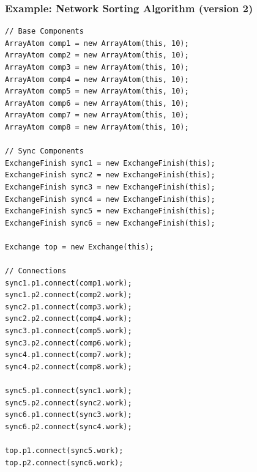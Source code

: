 \documentclass[compress,xcolor=dvipsnames,10pt]{beamer}
\begin{document}
\begin{frame}[fragile]
 \frametitle{Example: Network Sorting Algorithm (version 2)}
        \begin{lstlisting}[style=customjava, basicstyle=\ttfamily\tiny]
// Base Components
ArrayAtom comp1 = new ArrayAtom(this, 10);
ArrayAtom comp2 = new ArrayAtom(this, 10);
ArrayAtom comp3 = new ArrayAtom(this, 10);
ArrayAtom comp4 = new ArrayAtom(this, 10);
ArrayAtom comp5 = new ArrayAtom(this, 10);
ArrayAtom comp6 = new ArrayAtom(this, 10);
ArrayAtom comp7 = new ArrayAtom(this, 10);
ArrayAtom comp8 = new ArrayAtom(this, 10);

// Sync Components
ExchangeFinish sync1 = new ExchangeFinish(this);
ExchangeFinish sync2 = new ExchangeFinish(this);
ExchangeFinish sync3 = new ExchangeFinish(this);
ExchangeFinish sync4 = new ExchangeFinish(this);
ExchangeFinish sync5 = new ExchangeFinish(this);
ExchangeFinish sync6 = new ExchangeFinish(this);

Exchange top = new Exchange(this);

// Connections
sync1.p1.connect(comp1.work);
sync1.p2.connect(comp2.work);
sync2.p1.connect(comp3.work);
sync2.p2.connect(comp4.work);
sync3.p1.connect(comp5.work);
sync3.p2.connect(comp6.work);
sync4.p1.connect(comp7.work);
sync4.p2.connect(comp8.work);

sync5.p1.connect(sync1.work);
sync5.p2.connect(sync2.work);
sync6.p1.connect(sync3.work);
sync6.p2.connect(sync4.work);

top.p1.connect(sync5.work);
top.p2.connect(sync6.work);
\end{lstlisting}
\end{frame}
\end{document}
